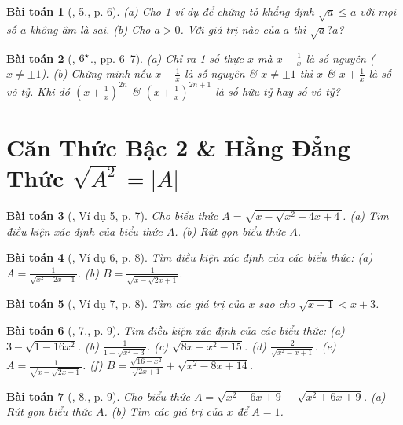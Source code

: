 \documentclass{article}
\newtheorem{baitoan}{Bài toán}
\begin{document}
\begin{baitoan}[\cite{Binh_Toan_9_tap_1}, 5., p. 6]
	(a) Cho 1 ví dụ để chứng tỏ khẳng định $\sqrt{a}\le a$ với mọi số $a$ không âm là sai. (b) Cho $a > 0$. Với giá trị nào của $a$ thì $\sqrt{a} ? a$?
\end{baitoan}

\begin{baitoan}[\cite{Binh_Toan_9_tap_1}, $\rm6^\star$., pp. 6--7]
	(a) Chỉ ra 1 số thực $x$ mà $x - \frac{1}{x}$ là số nguyên ($x\ne\pm1$). (b) Chứng minh nếu $x - \frac{1}{x}$ là số nguyên \& $x\ne\pm1$ thì $x$ \& $x + \frac{1}{x}$ là số vô tỷ. Khi đó $\left(x + \frac{1}{x}\right)^{2n}$ \& $\left(x + \frac{1}{x}\right)^{2n+1}$ là số hữu tỷ hay số vô tỷ?
\end{baitoan}


\section{Căn Thức Bậc 2 \& Hằng Đẳng Thức $\sqrt{A^2} = |A|$}

\begin{baitoan}[\cite{Binh_Toan_9_tap_1}, Ví dụ 5, p. 7]
	Cho biểu thức $A = \sqrt{x - \sqrt{x^2 - 4x + 4}}$. (a) Tìm điều kiện xác định của biểu thức $A$. (b) Rút gọn biểu thức $A$.
\end{baitoan}

\begin{baitoan}[\cite{Binh_Toan_9_tap_1}, Ví dụ 6, p. 8]
	Tìm điều kiện xác định của các biểu thức: (a) $A = \frac{1}{\sqrt{x^2 - 2x - 1}}$. (b) $B = \frac{1}{\sqrt{x - \sqrt{2x + 1}}}$.
\end{baitoan}

\begin{baitoan}[\cite{Binh_Toan_9_tap_1}, Ví dụ 7, p. 8]
	Tìm các giá trị của $x$ sao cho $\sqrt{x + 1} < x + 3$.
\end{baitoan}

\begin{baitoan}[\cite{Binh_Toan_9_tap_1}, 7., p. 9]
	Tìm điều kiện xác định của các biểu thức: (a) $3 - \sqrt{1 - 16x^2}$. (b) $\frac{1}{1 - \sqrt{x^2 - 3}}$. (c) $\sqrt{8x - x^2 - 15}$. (d) $\frac{2}{\sqrt{x^2 - x + 1}}$. (e) $A = \frac{1}{\sqrt{x - \sqrt{2x - 1}}}$. (f) $B = \frac{\sqrt{16 - x^2}}{\sqrt{2x + 1}} + \sqrt{x^2 - 8x + 14}$.
\end{baitoan}

\begin{baitoan}[\cite{Binh_Toan_9_tap_1}, 8., p. 9]
	Cho biểu thức $A = \sqrt{x^2 - 6x + 9} - \sqrt{x^2 + 6x + 9}$. (a) Rút gọn biểu thức $A$. (b) Tìm các giá trị của $x$ để $A = 1$.
\end{baitoan}
\end{document}
